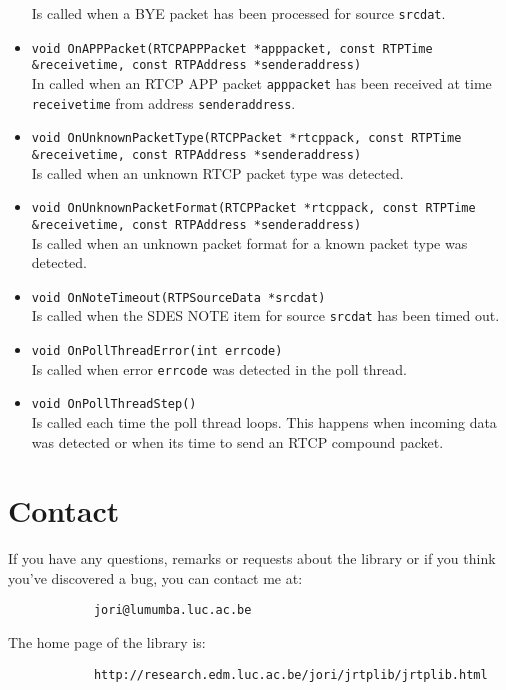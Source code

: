 \documentclass[12pt,a4paper]{article}
\begin{document}
\begin{itemize}
						Is called when a BYE packet has been processed for source
						{\tt srcdat}.
					\item {\tt void OnAPPPacket(RTCPAPPPacket *apppacket, const RTPTime \&receivetime,
					                                    const RTPAddress *senderaddress)}\\
						In called when an RTCP APP packet {\tt apppacket} has been received 
						at time {\tt receivetime} from address {\tt senderaddress}.
					\item {\tt void OnUnknownPacketType(RTCPPacket *rtcppack, const RTPTime \&receivetime,
					                                            const RTPAddress *senderaddress)}\\
						Is called when an unknown RTCP packet type was detected.
					\item {\tt void OnUnknownPacketFormat(RTCPPacket *rtcppack, const RTPTime \&receivetime,
					                                              const RTPAddress *senderaddress)}\\
						Is called when an unknown packet format for a known packet
						type was detected.
					\item {\tt void OnNoteTimeout(RTPSourceData *srcdat)}\\
						Is called when the SDES NOTE item for source {\tt srcdat}
						has been timed out.
					\item {\tt void OnPollThreadError(int errcode)}\\
						Is called when error {\tt errcode} was detected in the
						poll thread.
					\item {\tt void OnPollThreadStep()}\\
						Is called each time the poll thread loops. This happens when
						incoming data was detected or when its time to send an RTCP
						compound packet.
				\end{itemize}

	\section{Contact}
		
		If you have any questions, remarks or requests about the library or
		if you think you've discovered a bug, you can contact me at:
		\begin{verbatim}
			jori@lumumba.luc.ac.be
		\end{verbatim}
		
		The home page of the library is:
		\begin{verbatim}
			http://research.edm.luc.ac.be/jori/jrtplib/jrtplib.html
		\end{verbatim}
\end{document}
